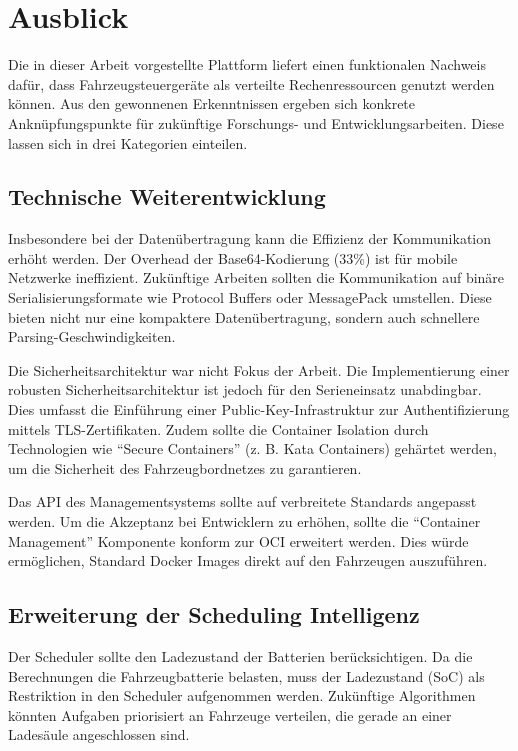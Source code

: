 \chapter{Ausblick}
\label{Ausblick}

Die in dieser Arbeit vorgestellte Plattform liefert einen funktionalen Nachweis dafür, dass Fahrzeugsteuergeräte als verteilte Rechenressourcen genutzt werden können. Aus den gewonnenen Erkenntnissen ergeben sich konkrete Anknüpfungspunkte für zukünftige Forschungs- und Entwicklungsarbeiten. Diese lassen sich in drei Kategorien einteilen.

\section{Technische Weiterentwicklung}

Insbesondere bei der Datenübertragung kann die Effizienz der Kommunikation erhöht werden. Der Overhead der Base64-Kodierung (33\%) ist für mobile Netzwerke ineffizient. Zukünftige Arbeiten sollten die Kommunikation auf binäre Serialisierungsformate wie Protocol Buffers oder MessagePack umstellen. Diese bieten nicht nur eine kompaktere Datenübertragung, sondern auch schnellere Parsing-Geschwindigkeiten.

Die Sicherheitsarchitektur war nicht Fokus der Arbeit. Die Implementierung einer robusten Sicherheitsarchitektur ist jedoch für den Serieneinsatz unabdingbar. Dies umfasst die Einführung einer Public-Key-Infrastruktur zur Authentifizierung mittels TLS-Zertifikaten. Zudem sollte die Container Isolation durch Technologien wie \enquote{Secure Containers} (z. B. Kata Containers) gehärtet werden, um die Sicherheit des Fahrzeugbordnetzes zu garantieren.

Das \gls{API} des Managementsystems sollte auf verbreitete Standards angepasst werden. Um die Akzeptanz bei Entwicklern zu erhöhen, sollte die \enquote{Container Management} Komponente konform zur \gls{OCI} erweitert werden. Dies würde ermöglichen, Standard Docker Images direkt auf den Fahrzeugen auszuführen.

\section{Erweiterung der Scheduling Intelligenz}

Der Scheduler sollte den Ladezustand der Batterien berücksichtigen. Da die Berechnungen die Fahrzeugbatterie belasten, muss der Ladezustand (SoC) als Restriktion in den Scheduler aufgenommen werden. Zukünftige Algorithmen könnten Aufgaben priorisiert an Fahrzeuge verteilen, die gerade an einer Ladesäule angeschlossen sind.

